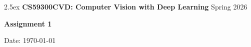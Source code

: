 \documentclass[oneside,11pt,letter]{article}
\newcommand{\myname}{}
\newcommand{\report}{}
\begin{document}

\thispagestyle{empty}
\begin{mdframed}
\baselineskip2.5ex
{\bf CS59300CVD: Computer Vision with Deep Learning}
\hfill
Spring 2026

{\Large
\begin{center}
{\bf \sf Assignment 1}
\end{center}
}

{\bf \myname}
\hfill
Date: \today
\end{mdframed}

\report{}

\end{document}
